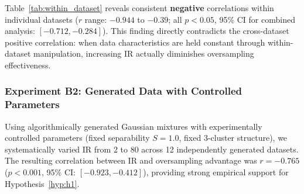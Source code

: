 \documentclass[12pt,a4paper]{article}
\theoremstyle{definition}
\begin{document}
Table~\ref{tab:within_dataset} reveals consistent \textbf{negative} correlations within individual datasets ($r$ range: $-0.944$ to $-0.39$; all $p < 0.05$, 95\% CI for combined analysis: $[-0.712, -0.284]$). This finding directly contradicts the cross-dataset positive correlation: when data characteristics are held constant through within-dataset manipulation, increasing IR actually diminishes oversampling effectiveness.

\subsubsection{Experiment B2: Generated Data with Controlled Parameters}
Using algorithmically generated Gaussian mixtures with experimentally controlled parameters (fixed separability $S=1.0$, fixed 3-cluster structure), we systematically varied IR from 2 to 80 across 12 independently generated datasets. The resulting correlation between IR and oversampling advantage was $r = -0.765$ ($p < 0.001$, 95\% CI: $[-0.923, -0.412]$), providing strong empirical support for Hypothesis~\ref{hyp:h1}.
\end{document}

